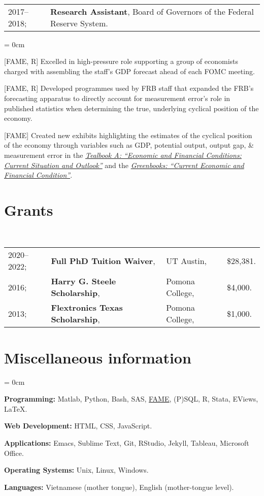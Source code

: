 \documentclass[a4paper, 10pt]{article}
\begin{document}
  ~\begin{tabular}{ll}
    2017--2018; & \textbf{Research Assistant}, Board of Governors of the Federal Reserve System.
  \end{tabular}
  \begin{compactitem}\parskip = 0cm
    \item {[FAME, R]} Excelled in high-pressure role supporting a group of economists charged with assembling the staff's GDP forecast ahead of each FOMC meeting.
    \item {[FAME, R]} Developed programmes used by FRB staff that expanded the FRB's forecasting apparatus to directly account for measurement error's role in published statistics when determining the true, underlying cyclical position of the economy.
    \item {[FAME]} Created new exhibits highlighting the estimates of the cyclical position of the economy through variables such as GDP, potential output, output gap, \& measurement error in the \href{https://www.federalreserve.gov/monetarypolicy/fomc_historical.htm#tealbooks}{\textit{Tealbook A: ``Economic and Financial Conditions: Current Situation and Outlook''}} and the \href{https://www.federalreserve.gov/monetarypolicy/fomc_historical.htm#greenbooks}{\textit{Greenbooks: ``Current Economic and Financial Condition''}}.
  \end{compactitem}
  \vspace*{0.25em}
      
  \section{Grants}
  ~\begin{tabular}{llll}
    2020--2022; & \textbf{Full PhD Tuition Waiver}, & UT Austin, & \$28,381.\\
    2016; & \textbf{Harry G. Steele Scholarship}, & Pomona College, & \$4,000.\\
    2013; & \textbf{Flextronics Texas Scholarship}, & Pomona College, & \$1,000.
  \end{tabular}
  \vspace*{0.25em}
    
  \section{Miscellaneous information}
  \begin{compactitem}\parskip = 0cm
    \item \textbf{Programming:} Matlab, Python, Bash, SAS, \href{https://en.wikipedia.org/wiki/FAME_(database)}{FAME}, (P)SQL, R, Stata, EViews, \LaTeX.
    \item \textbf{Web Development:} HTML, CSS, JavaScript.
    \item \textbf{Applications:} Emacs, Sublime Text, Git, RStudio, Jekyll, Tableau, Microsoft Office.
    \item \textbf{Operating Systems:} Unix, Linux, Windows.
    \item \textbf{Languages:} Vietnamese (mother tongue), English (mother-tongue level).
  \end{compactitem}
\end{document}

